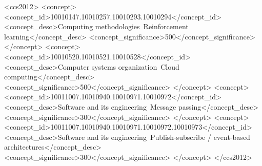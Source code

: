 \documentclass[manuscript]{acmart}
\begin{document}
\begin{abstract}
In a locked scale-out simulator experiment, 20,000 subscriptions carry 775
million queued events on ten connections established on one Pod. Across 20
paired seeds, adding three Pods with unchanged connection placement yields
58,000 events/s. Probe-guided DQL and guarded-greedy migration yield 219,762
and 221,260 events/s, respectively. DQL reduces normalized backlog area by
12.30\% relative to unchanged placement (paired difference $-0.117504$;
95\% confidence interval $[-0.121210,-0.113345]$). The comparison establishes
the value of connection reassociation under the stated service model.
In a separate mixed-workload holdout, DQL improves mean composite reward by
0.0318 and reduces subscription-count variance by 90.0\% relative to the
two-dimensional heuristic, with a 4.5\% throughput tradeoff. Oracle Cloud
experiments establish execution of the mechanism: ten connection replacements
reassociate 4,000 of 20,000 subscriptions, and a loaded scale-out trial completes
three selective handoffs while retaining the other sessions and confirming
all 8,000 observed delivery ACKs. The framework therefore offers both a
transparent greedy policy and a learned multi-objective policy, with their
benefits evaluated separately from the shared handoff mechanism.
\end{abstract}

\begin{CCSXML}
<ccs2012>
 <concept>
  <concept_id>10010147.10010257.10010293.10010294</concept_id>
  <concept_desc>Computing methodologies~Reinforcement learning</concept_desc>
  <concept_significance>500</concept_significance>
 </concept>
 <concept>
  <concept_id>10010520.10010521.10010528</concept_id>
  <concept_desc>Computer systems organization~Cloud computing</concept_desc>
  <concept_significance>500</concept_significance>
 </concept>
 <concept>
  <concept_id>10011007.10010940.10010971.10010972</concept_id>
  <concept_desc>Software and its engineering~Message passing</concept_desc>
  <concept_significance>300</concept_significance>
 </concept>
 <concept>
  <concept_id>10011007.10010940.10010971.10010972.10010973</concept_id>
  <concept_desc>Software and its engineering~Publish-subscribe / event-based architectures</concept_desc>
  <concept_significance>300</concept_significance>
 </concept>
</ccs2012>
\end{CCSXML}
\end{document}
